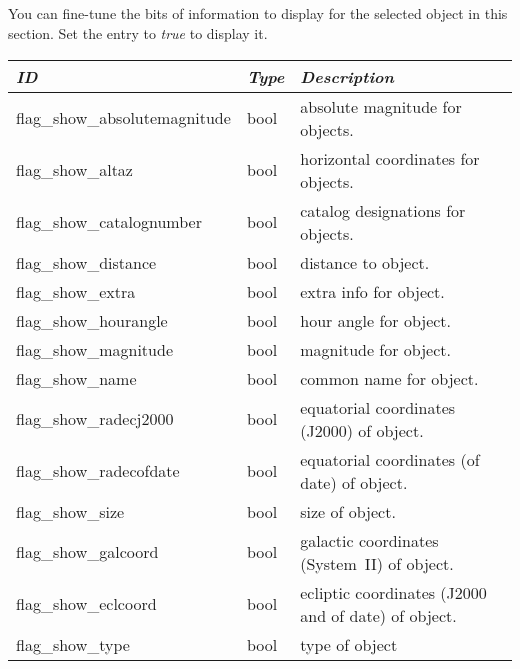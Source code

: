 \subsection{}
\label{sec:config.ini:custom_selected_info}

You can fine-tune the bits of information to display for the selected object in this section. Set the entry to \emph{true} to display it.

\begin{longtabu} to \textwidth {l|l|X}\toprule
\emph{ID} & \emph{Type} & \emph{Description}\\\midrule
flag\_show\_absolutemagnitude & bool & absolute magnitude for objects.\\\midrule
flag\_show\_altaz             & bool & horizontal coordinates for objects.\\\midrule
flag\_show\_catalognumber     & bool & catalog designations for objects.\\\midrule
flag\_show\_distance          & bool & distance to object.\\\midrule
flag\_show\_extra             & bool & extra info for object.\\\midrule
flag\_show\_hourangle         & bool & hour angle for object.\\\midrule
flag\_show\_magnitude         & bool & magnitude for object.\\\midrule
flag\_show\_name              & bool & common name for object.\\\midrule
flag\_show\_radecj2000        & bool & equatorial coordinates (J2000) of object.\\\midrule
flag\_show\_radecofdate       & bool & equatorial coordinates (of date) of object.\\\midrule
flag\_show\_size              & bool & size of object.\\\midrule
flag\_show\_galcoord          & bool & galactic coordinates (System~II) of object.\\\midrule
flag\_show\_eclcoord          & bool & ecliptic coordinates (J2000 and of date) of object.\\\midrule
flag\_show\_type              & bool & type of object\\\bottomrule
\end{longtabu}


\subsection{}
\label{sec:config.ini:custom_time_correction}

